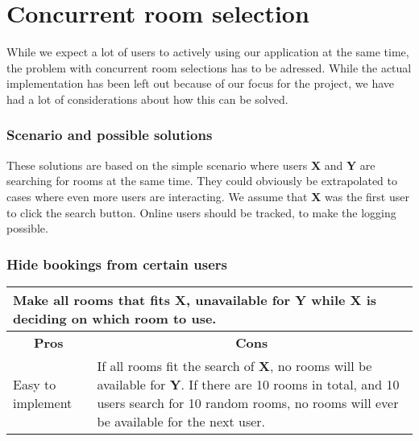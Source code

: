 \section{Concurrent room selection}
\label{sub:challenges_concurrent_rooms}
While we expect a lot of users to actively using our application at the same time, the problem with concurrent room selections has to be adressed. While the actual implementation has been left out because of our focus for the project, we have had a lot of considerations about how this can be solved.\\

\subsubsection*{Scenario and possible solutions}
These solutions are based on the simple scenario where users \textbf{X} and \textbf{Y} are searching for rooms at the same time. They could obviously be extrapolated to cases where even more users are interacting. We assume that \textbf{X} was the first user to click the search button. Online users should be tracked, to make the logging possible.
\subsubsection*{Hide bookings from certain users}
\begin{tabular}{|p{6cm}|p{6cm}|}
\hline 
	\multicolumn{2}{|p{12cm}|}{Make all rooms that fits \textbf{X}, unavailable for \textbf{Y} while \textbf{X} is deciding on which room to use.} \\ \hline \hline
	\multicolumn{1}{|c|}{\textbf{Pros}} & \multicolumn{1}{c|}{\textbf{Cons}} \\ \hline
	Easy to implement & If all rooms fit the search of \textbf{X}, no rooms will be available for \textbf{Y}. If there are 10 rooms in total, and 10 users search for 10 random rooms, no rooms will ever be available for the next user. \\
	\hline
\end{tabular}
\\
